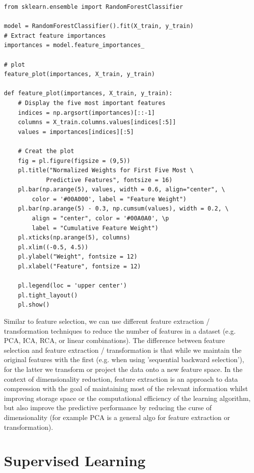 \documentclass[11pt]{article}
\begin{document}
\begin{lstlisting}
from sklearn.ensemble import RandomForestClassifier

model = RandomForestClassifier().fit(X_train, y_train)
# Extract feature importances 
importances = model.feature_importances_ 

# plot
feature_plot(importances, X_train, y_train)

def feature_plot(importances, X_train, y_train):
	# Display the five most important features
	indices = np.argsort(importances)[::-1]
	columns = X_train.columns.values[indices[:5]]
	values = importances[indices][:5]

	# Creat the plot
	fig = pl.figure(figsize = (9,5))
	pl.title("Normalized Weights for First Five Most \
			Predictive Features", fontsize = 16)
	pl.bar(np.arange(5), values, width = 0.6, align="center", \ 
		color = '#00A000', label = "Feature Weight")
	pl.bar(np.arange(5) - 0.3, np.cumsum(values), width = 0.2, \
		align = "center", color = '#00A0A0', \p
		label = "Cumulative Feature Weight")
	pl.xticks(np.arange(5), columns)
	pl.xlim((-0.5, 4.5))
	pl.ylabel("Weight", fontsize = 12)
	pl.xlabel("Feature", fontsize = 12)

	pl.legend(loc = 'upper center')
	pl.tight_layout()
	pl.show()  
\end{lstlisting}

Similar to feature selection, we can use different feature extraction / transformation techniques to reduce the number of features in a dataset (e.g. PCA, ICA, RCA, or linear combinations). The difference between feature selection and feature extraction / transformation is that while we maintain the original features  with the first (e.g. when using 'sequential backward selection'), for the latter we transform or project the data onto a new feature space. In the context of dimensionality reduction, feature extraction is an approach to data compression with the goal of maintaining most of the relevant information whilst improving storage space or the computational efficiency of the learning algorithm, but also improve the predictive performance by reducing the curse of dimensionality (for example PCA is a general algo for feature extraction or transformation).

\section{Supervised Learning}
\end{document}
